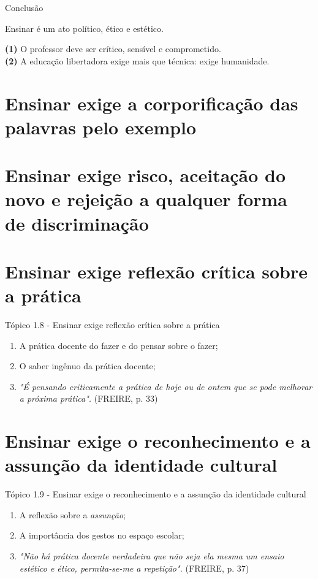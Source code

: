 \documentclass[12pt]{beamer}
\begin{document}
	\begin{frame}{Conclusão}
		
		\begin{alertblock}{\justifying Ensinar é um ato político, ético e estético.}
			
			\justifying
			\textbf{(1)} O professor deve ser crítico, sensível e comprometido. \\
			\textbf{(2)} A educação libertadora exige mais que técnica: exige humanidade.\\
	
		\end{alertblock}
		
	\end{frame}
\section{Ensinar exige a corporificação das palavras pelo exemplo}
\section{Ensinar exige risco, aceitação do novo e rejeição a qualquer forma de discriminação}
\section{Ensinar exige reflexão crítica sobre a prática}

	\begin{frame}{Tópico 1.8 - Ensinar exige reflexão crítica sobre a prática}
		\begin{enumerate}
			\justifying
			\item A prática docente do fazer e do pensar sobre o fazer; \\
			\item O saber ingênuo da prática docente; \\
			\item \textit{"É pensando criticamente a prática de hoje ou de ontem que se pode melhorar a próxima prática".} (FREIRE, p. 33)
		\end{enumerate}
	\end{frame}
	
\section{Ensinar exige o reconhecimento e a assunção da identidade cultural}

	\begin{frame}{Tópico 1.9 - Ensinar exige o reconhecimento e a assunção da identidade cultural}
		\begin{enumerate}
			\justifying
			\item A reflexão sobre a \textit{assunção}; \\
			\item A importância dos gestos no espaço escolar; \\
			\item \textit{"Não há prática docente verdadeira que não seja ela mesma um ensaio estético e ético, permita-se-me a repetição".}  (FREIRE, p. 37)
		\end{enumerate}
	\end{frame}
\end{document}
